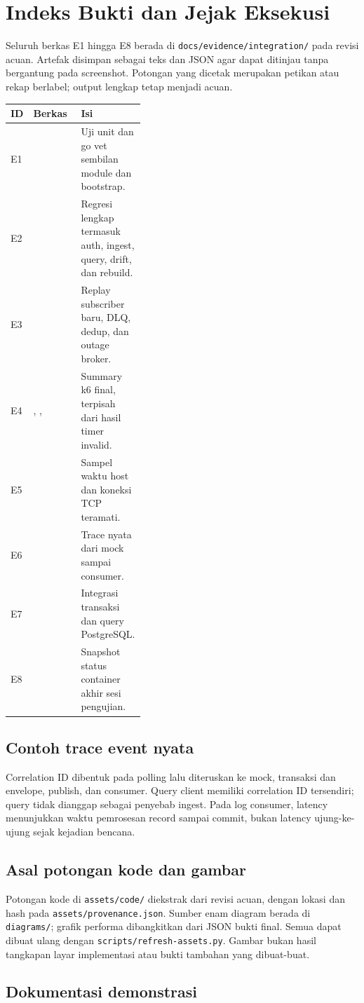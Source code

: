 \section{Indeks Bukti dan Jejak Eksekusi}
\label{app:evidence}
Seluruh berkas E1 hingga E8 berada di \nolinkurl{docs/evidence/integration/} pada revisi acuan. Artefak disimpan sebagai teks dan JSON agar dapat ditinjau tanpa bergantung pada screenshot. Potongan yang dicetak merupakan petikan atau rekap berlabel; output lengkap tetap menjadi acuan.

\begin{tabularx}{\linewidth}{lP{0.38\linewidth}Y}
\toprule ID & Berkas & Isi\\\midrule
E1 &  & Uji unit dan go vet sembilan module dan bootstrap.\\
E2 &  & Regresi lengkap termasuk auth, ingest, query, drift, dan rebuild.\\
E3 &  & Replay subscriber baru, DLQ, dedup, dan outage broker.\\
E4 & , ,  & Summary k6 final, terpisah dari hasil timer invalid.\\
E5 &  & Sampel waktu host dan koneksi TCP teramati.\\
E6 &  & Trace nyata dari mock sampai consumer.\\
E7 &  & Integrasi transaksi dan query PostgreSQL.\\
E8 &  & Snapshot status container akhir sesi pengujian.\\
\bottomrule
\end{tabularx}

\subsection{Contoh trace event nyata}

Correlation ID dibentuk pada polling lalu diteruskan ke mock, transaksi dan envelope, publish, dan consumer. Query client memiliki correlation ID tersendiri; query tidak dianggap sebagai penyebab ingest. Pada log consumer, latency menunjukkan waktu pemrosesan record sampai commit, bukan latency ujung-ke-ujung sejak kejadian bencana.

\subsection{Asal potongan kode dan gambar}
Potongan kode di \nolinkurl{assets/code/} diekstrak dari revisi acuan, dengan lokasi dan hash pada \nolinkurl{assets/provenance.json}. Sumber enam diagram berada di \nolinkurl{diagrams/}; grafik performa dibangkitkan dari JSON bukti final. Semua dapat dibuat ulang dengan \nolinkurl{scripts/refresh-assets.py}. Gambar bukan hasil tangkapan layar implementasi atau bukti tambahan yang dibuat-buat.

\subsection{Dokumentasi demonstrasi}
